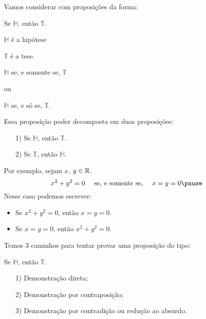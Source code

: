 \documentclass{beamer}
\begin{document}
    \begin{frame}
        Vamos considerar com proposi\c{c}\~oes da forma:\pause

        \begin{center}
            Se $\mathbb{H}$, ent\~ao $\mathbb{T}$.\pause
        \end{center}

        $\mathbb{H}$ \'e a hip\'otese\pause

        $\mathbb{T}$ \'e a tese.\pause

        \begin{center}
            $\mathbb{H}$ se, e somente se, $\mathbb{T}$\pause

            ou

            $\mathbb{H}$ se, e s\'o se, $\mathbb{T}$.\pause
        \end{center}

        Essa proposi\c{c}\~ao poder decomposta em duas proposi\c{c}\~oes:\pause
        \begin{itemize}
            \item[1)] Se $\mathbb{H}$, ent\~ao $\mathbb{T}$.\pause
            \item[2)] Se $\mathbb{T}$, ent\~ao $\mathbb{H}$.
        \end{itemize}
    \end{frame}

    \begin{frame}
        Por exemplo, sejam $x$, $y \in \mathbb{R}$.\pause
        \[
            x^2 + y^2 = 0 \quad\mbox{ se, e somente se, }\quad x = y = 0\pause
        \]
        Nesse caso podemos escrever:
        \begin{itemize}
            \item Se $x^2 + y^2 = 0$, ent\~ao $x = y = 0$.\pause
            \item Se $x = y = 0$, ent\~ao $x^2 + y^2 = 0$.
        \end{itemize}
    \end{frame}

    \begin{frame}
        Temos 3 caminhos para tentar provar uma proposi\c{c}\~ao do tipo:
        \begin{center}
            Se $\mathbb{H}$, ent\~ao $\mathbb{T}$.\pause
        \end{center}

        \begin{itemize}
            \item[1)] Demonstra\c{c}\~ao direta;\pause
            \item[2)] Demonstra\c{c}\~ao por contraposi\c{c}\~ao;\pause
            \item[3)] Demonstra\c{c}\~ao por contradi\c{c}\~ao ou redu\c{c}\~ao ao absurdo.\pause
        \end{itemize}
    \end{frame}
\end{document}
